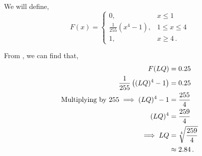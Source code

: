 \begin{subquestions}
\begin{subsubquestions}
We will define,
\[ F(x) = \begin{cases} 
	0 , & x\leq 1 \\
	\frac{1}{255}\left(x^4 - 1 \right), & 1 \leq x \leq 4 \\
	1, & x \geq 4 \,.
\end{cases}
\]


\subsubquestion

From , we can find that,
\begin{align}
	F(LQ) & = 0.25 \nonumber \\
	\frac{1}{255}\left((LQ)^4 - 1 \right) & = 0.25 \nonumber \\
	\text{Multiplying by 255} \implies (LQ)^4 - 1 & = \frac{255}{4} \nonumber \\
	(LQ)^4 & = \frac{259}{4} \nonumber \\
	\implies LQ & = \sqrt[4]{\frac{259}{4}} \nonumber \\
	           & \approx 2.84 \,. 
\end{align}	

\end{subsubquestions}
	
\end{subquestions}
